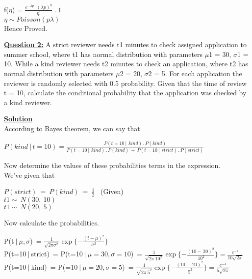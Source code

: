 \documentclass[12pt]{article}
\begin{document}
        \begin{center}
        f($\eta$) = $\frac{e^{-\lambda p}\,\,\,(\lambda p)^{\eta}}{\eta!}\,\,.\,1$\\
        $\eta \sim Poisson(p\lambda)$\\
        \normalsize Hence Proved.
        \end{center}



\normalsize
\vspace{20mm}


\textbf{\underline{Question 2:}} A strict reviewer needs t1 minutes to check assigned application to summer school, where t1 has normal distribution with parameters $\mu$1 = 30, $\sigma$1 = 10. While a kind reviewer needs t2 minutes to check an application, where t2 has normal distribution with parameters $\mu$2 = 20, $\sigma$2 = 5. For each application the reviewer is randomly selected with 0.5 probability. Given that the time of review t = 10, calculate the conditional probability that the application was checked by a kind reviewer.

\textbf{\underline{Solution}}\\
        According to Bayes theorem, we can say that\\
        
        \begin{center}
        \Large
        $P(kind\ | \,t = 10) = \frac{P(t = 10\ |\ \,kind)\,.\,P(kind)}{P(t = 10\ |\ \,kind)\,.\,P(kind)\ + \ P(t = 10\ |\ \,strict)\,.\,P(strict)} $
        \normalsize
        \end{center}
        
        Now determine the values of these probabilities terms in the expression.\\
        We've given that\\
        
        \begin{center}
        $P(strict)\ =\ P(kind)\ = \ \frac{1}{2}$ \,\,\,(Given)\\
        $t1 \sim\ N(30,\ 10)$\\
        $t1 \sim\ N(20,\ 5)$\\
        \end{center}
        
        Now calculate the probabilities.
        
        \begin{center}
        P(t$\ |\ \mu, \sigma$)\ = $\frac{1}{\sqrt{2\pi\sigma^2}}\exp\{{-\frac{(t-\mu)^2}{\sigma^2}}\}$ \\
        
        P(t=10$\ |\ $strict)\ = P(t=10$\ |\ \mu=30, \sigma=10$)\ = $\frac{1}{\sqrt{2\pi\ 10^2}}\exp\{{-\frac{(10-\ 30)^2}{\ 10^2}}\} = \frac{e^{-4}}{10\sqrt{2\pi}}$\\
        
        P(t=10$\ |\ $kind)\ = P(=10$\ |\ \mu=20, \sigma=5$)\ = $\frac{1}{\sqrt{2\pi\ 5^2}}\exp\{{-\frac{(10-\ 20)^2}{\ 5^2}}\} = \frac{e^{-4}}{5\sqrt{2\pi}}$
        \end{center}
        
\end{document}
